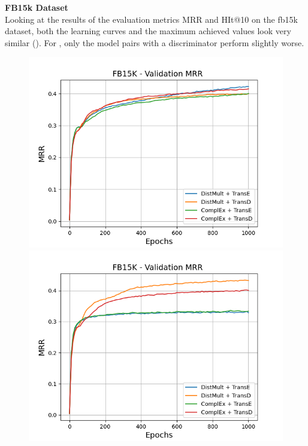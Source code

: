\textbf{FB15k Dataset}
\label{subsubsec:uncertainty_fb15k}\\
%
Looking at the results of the evaluation metrics MRR and HIt@10 on the fb15k dataset, both the learning curves and the maximum achieved values look very similar ().
For \usgan, only the model pairs with a \transe discriminator perform slightly worse.
\begin{figure}[H]
    \centering
    \begin{minipage}{.5\textwidth}
      \centering
      \includegraphics[width=0.9\linewidth]{figures/results/gan_train/not_pretrained/random/fb15k/1k_epochs/random_fb15k_mrrs.png}
    \end{minipage}%
    \begin{minipage}{.5\textwidth}
      \centering
      \includegraphics[width=0.9\linewidth]{figures/results/gan_train/not_pretrained/uncertainty/max_distribution/entropy/fb15k/1k_epochs/uncertainty_fb15k_mrrs.png}

\end{minipage}
\end{figure}
